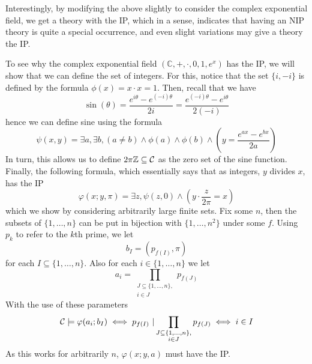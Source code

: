 Interestingly, by modifying the above slightly to consider the complex exponential field, we get a
theory with the IP, which in a sense, indicates that having an NIP theory is quite a special
occurrence, and even slight variations may give a theory the IP.

\begin{exmp}
  To see why the complex exponential field $(\mathbb{C},+,\cdot,0,1,e^x)$ has the IP, we will show
  that we can define the set of integers. For this, notice that the set $\{i,-i\}$ is defined by
  the formula $\phi(x) = x \cdot x = 1$. Then, recall that we have
  \begin{equation*}
    \sin(\theta) = \frac{e^{i\theta} - e^{(-i)\theta}}{2i}
                 = \frac{e^{(-i)\theta} - e^{i\theta}}{2(-i)}
  \end{equation*}
  hence we can define sine using the formula
  \begin{equation*}
    \psi(x,y) = \exists a, \exists b, (a \neq b) \land \phi(a) \land \phi(b) \land
      \left(y = \frac{e^{ax} - e^{bx}}{2a}\right)
  \end{equation*}
  In turn, this allows us to define $2\pi \mathbb{Z} \subseteq \mathbb{\mathcal{C}}$ as the zero set of the sine
  function. Finally, the following formula, which essentially says that as integers, $y$ divides
  $x$, has the IP
  \begin{equation*}
    \varphi(x;y,\pi) = \exists z, \psi(z,0) \land \left(y \cdot \frac{z}{2\pi} = x\right)
  \end{equation*}
  which we show by considering arbitrarily large finite sets. Fix some $n$, then the subsets of
  $\{1,\dots,n\}$ can be put in bijection with $\{1,\dots,n^2\}$ under some $f$. Using $p_k$
  to refer to the $k$th prime, we let
  \begin{equation*}
    b_I = (p_{f(I)}, \pi)
  \end{equation*}
  for each $I \subseteq \{1,\dots,n\}$. Also for each $i \in \{1,\dots,n\}$ we let
  \begin{equation*}
    a_i = \prod_{\substack{J \subseteq \{1,\dots,n\},\\ i \in J}} p_{f(J)}
  \end{equation*}
  With the use of these parameters
  \begin{equation*}
    \mathcal{C} \models \varphi(a_i;b_I)
      \iff p_{f(I)}\ | \prod_{\substack{J \subseteq \{1,\dots,n\},\\ i \in J}} p_{f(J)}
      \iff i \in I
  \end{equation*}
  As this works for arbitrarily $n$, $\varphi(x;y,a)$ must have the IP.
\end{exmp}
